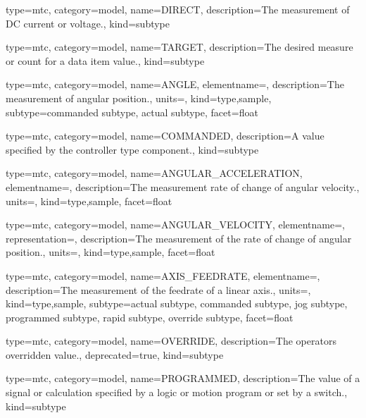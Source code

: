{
  type=mtc,
  category=model,
  name={DIRECT},
  description={The measurement of DC current or voltage.},
  kind={subtype}
}


{
  type=mtc,
  category=model,
  name={TARGET},
  description={The desired measure or count for a data item value.},
  kind={subtype}
}


{
  type=mtc,
  category=model,
  name={ANGLE},
  elementname=,
  description={The measurement of angular position.},
  units=,
  kind={type,sample},
  subtype={\gls{commanded subtype}, \gls{actual subtype}},
  facet={\gls{float}}
}


{
  type=mtc,
  category=model,
  name={COMMANDED},
  description={A value specified by the \gls{controller} type component.},
  kind={subtype}
}


{
  type=mtc,
  category=model,
  name={ANGULAR\_ACCELERATION},
  elementname=,
  description={The measurement rate of change of angular velocity.},
  units=,
  kind={type,sample},
  facet={\gls{float}}
}


{
  type=mtc,
  category=model,
  name={ANGULAR\_VELOCITY},
  elementname=,
  representation=,
  description={The measurement of the rate of change of angular position.},
  units=,
  kind={type,sample},
  facet={\gls{float}}
}


{
  type=mtc,
  category=model,
  name={AXIS\_FEEDRATE},
  elementname=,
  description={The measurement of the feedrate of a linear axis.},
  units=,
  kind={type,sample},
  subtype={\gls{actual subtype}, \gls{commanded subtype}, \gls{jog subtype}, \gls{programmed subtype}, \gls{rapid subtype}, \gls{override subtype}},
  facet={\gls{float}}
}



{
  type=mtc,
  category=model,
  name={OVERRIDE},
  description={The operators overridden value.},
  deprecated={true},
  kind={subtype}
}


{
  type=mtc,
  category=model,
  name={PROGRAMMED},
  description={The value of a signal or calculation specified by a logic or motion program or set by a switch.},
  kind={subtype}
}


